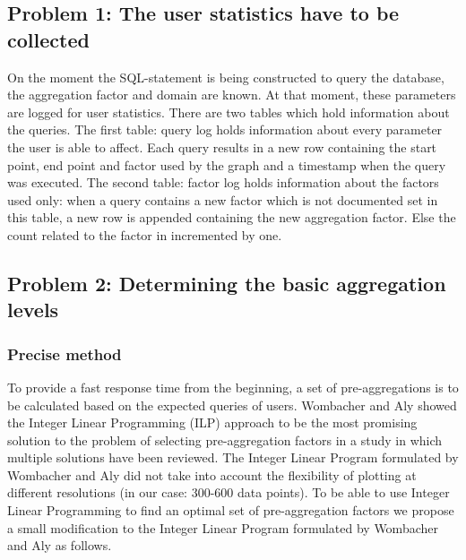 \subsection{Problem 1: The user statistics have to be collected}
On the moment the SQL-statement is being constructed to query the database, the aggregation factor and domain are known. At that moment, these parameters are logged for user statistics.
There are two tables which hold information about the queries. The first table: query log holds information about every parameter the user is able to affect. Each query results in a new row containing the start point, end point and factor used by the graph and a timestamp when the query was executed. The second table: factor log holds information about the factors used only: when a query contains a new factor which is not documented set in this table, a new row is appended containing the new aggregation factor. Else the count related to the factor in incremented by one.\\

\subsection{Problem 2: Determining the basic aggregation levels}
\subsubsection{Precise method}
To provide a fast response time from the beginning, a set of pre-aggregations is to be calculated based on the expected queries of users. Wombacher and Aly \cite{wombacher2011} showed the Integer Linear Programming (ILP) approach to be the most promising solution to the problem of selecting pre-aggregation factors in a study in which multiple solutions have been reviewed. The Integer Linear Program formulated by Wombacher and Aly \cite{wombacher2011} did not take into account the flexibility of plotting at different resolutions (in our case: 300-600 data points). To be able to use Integer Linear Programming to find an optimal set of pre-aggregation factors we propose a small modification to the Integer Linear Program formulated by Wombacher and Aly \cite{wombacher2011} as follows.
